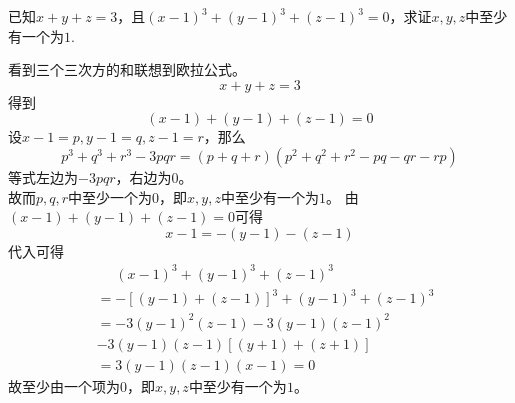 \documentclass[windows,csize4,answers]{BHCexam}
\begin{document}
\begin{groups}
\begin{questions}[]
\begin{solution}{0.5cm}
        \end{solution}
        \vspace{3.5cm}

        \question[5]  已知$x+y+z=3$，且$(x-1)^3+(y-1)^3+(z-1)^3=0$，求证$x,y,z$中至少有一个为$1$.
        \begin{solution}{0.5cm}
            \method 看到三个三次方的和联想到欧拉公式。
            \begin{equation}
                x+y+z=3
            \end{equation}
            得到
            \begin{equation}
                (x-1)+(y-1)+(z-1)=0
            \end{equation}
            设$x-1=p,y-1=q,z-1=r$，那么
            \begin{equation}
                \label{eq:6_1}
                p^3+q^3+r^3-3pqr=(p+q+r)(p^2+q^2+r^2-pq-qr-rp)
            \end{equation}
            等式左边为$-3pqr$，右边为$0$。 \\ 
            故而$p,q,r$中至少一个为$0$，即$x,y,z$中至少有一个为$1$。
            \method 由$(x-1)+(y-1)+(z-1)=0$可得
            \[
                x-1=-(y-1)-(z-1)    
            \]
            代入可得
            \[
                \begin{aligned}
                    &\phantom{=}(x-1)^3+(y-1)^3+(z-1)^3 \\ 
                    &=-[(y-1)+(z-1)]^3+(y-1)^3+(z-1)^3 \\ 
                    & = -3(y-1)^2(z-1)-3(y-1)(z-1)^2 \\ 
                    &-3(y-1)(z-1)[(y+1)+(z+1)] \\ 
                    &=3(y-1)(z-1)(x-1) =0
                \end{aligned}
            \]
            故至少由一个项为$0$，即$x,y,z$中至少有一个为$1$。
        \end{solution}
        \vspace{3.5cm}


\end{questions}
\end{groups}
\end{document}

